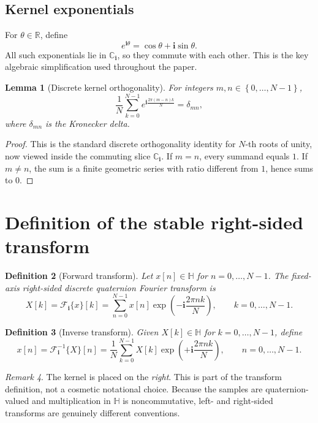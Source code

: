 \documentclass[11pt]{article}
\newtheorem{definition}{Definition}[section]
\newtheorem{lemma}[definition]{Lemma}
\theoremstyle{remark}
\newtheorem{remark}[definition]{Remark}
\newcommand{\R}{\mathbb{R}}
\newcommand{\C}{\mathbb{C}}
\newcommand{\HH}{\mathbb{H}}
\newcommand{\Ci}{\C_{\mathbf{i}}}
\newcommand{\ii}{\mathbf{i}}
\newcommand{\F}{\mathcal{F}_{\ii}}
\newcommand{\Finv}{\mathcal{F}_{\ii}^{-1}}
\newcommand{\set}[1]{\left\{ #1 \right\}}
\begin{document}
\subsection{Kernel exponentials}

For \(\theta\in\R\), define
\[
e^{\ii\theta}=\cos\theta+\ii\sin\theta.
\]
All such exponentials lie in \(\Ci\), so they commute with each other. This is the key algebraic simplification used throughout the paper.

\begin{lemma}[Discrete kernel orthogonality]
For integers \(m,n\in\set{0,\dots,N-1}\),
\[
\frac1N\sum_{k=0}^{N-1} e^{\ii \frac{2\pi (m-n)k}{N}}
=
\delta_{mn},
\]
where \(\delta_{mn}\) is the Kronecker delta.
\end{lemma}

\begin{proof}
This is the standard discrete orthogonality identity for \(N\)-th roots of unity, now viewed inside the commuting slice \(\Ci\). If \(m=n\), every summand equals \(1\). If \(m\neq n\), the sum is a finite geometric series with ratio different from \(1\), hence sums to \(0\).
\end{proof}

\section{Definition of the stable right-sided transform}

\begin{definition}[Forward transform]
Let \(x[n]\in\HH\) for \(n=0,\dots,N-1\). The fixed-axis right-sided discrete quaternion Fourier transform is
\[
X[k]=\F\{x\}[k]
=
\sum_{n=0}^{N-1} x[n]\exp\!\left(-\ii\frac{2\pi nk}{N}\right),
\qquad
k=0,\dots,N-1.
\]
\end{definition}

\begin{definition}[Inverse transform]
Given \(X[k]\in\HH\) for \(k=0,\dots,N-1\), define
\[
x[n]=\Finv\{X\}[n]
=
\frac1N\sum_{k=0}^{N-1} X[k]\exp\!\left(+\ii\frac{2\pi nk}{N}\right),
\qquad
n=0,\dots,N-1.
\]
\end{definition}

\begin{remark}
The kernel is placed on the \emph{right}. This is part of the transform definition, not a cosmetic notational choice. Because the samples are quaternion-valued and multiplication in \(\HH\) is noncommutative, left- and right-sided transforms are genuinely different conventions.
\end{remark}
\end{document}
